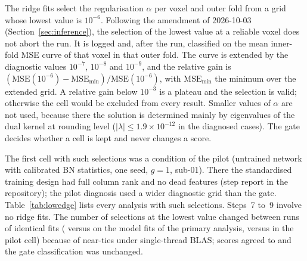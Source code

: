 The ridge fits select the regularisation $\alpha$ per voxel and outer fold from a grid whose
lowest value is $10^{-6}$. Following the amendment of 2026-10-03 (Section~\ref{sec:inference}),
the selection of the lowest value at a reliable voxel does not abort the run. It is logged
and, after the run, classified on the mean inner-fold MSE curve of that voxel in that outer
fold. The curve is extended by the diagnostic values $10^{-7}$, $10^{-8}$ and $10^{-9}$, and
the relative gain is $(\mathrm{MSE}(10^{-6}) - \mathrm{MSE}_{\min}) / \mathrm{MSE}(10^{-6})$,
with $\mathrm{MSE}_{\min}$ the minimum over the extended grid. A relative gain below $10^{-3}$
is a plateau and the selection is valid; otherwise the cell would be excluded from every
result. Smaller values of $\alpha$ are not used, because there the solution is determined mainly by
eigenvalues of the dual kernel at rounding level ($|\lambda| \leq 1.9 \times 10^{-12}$ in the
diagnosed cases). The gate decides whether a cell is kept and never changes a score.

The first cell with such selections was a condition of the pilot (untrained network with
calibrated BN statistics, one seed, $g = 1$, sub-01). There the standardised training design had full column rank
and no dead features (step report in the repository); the pilot diagnosis used a wider
diagnostic grid than the gate. Table~\ref{tab:lowedge} lists every analysis with such
selections. Steps~7 to~9 involve no ridge fits. The number of selections at the lowest value changed
between runs of identical fits (\FSkillLowEdgeHits{} versus \LowEdgePrimaryModelHits{} on the
model fits of the primary analysis, \LowEdgeEtwoHits{} versus \LowEdgePilotHits{} in the
pilot cell) because of near-ties under single-thread BLAS; scores agreed to
\FSkillGateMaxDelta{} and the gate classification was unchanged.

